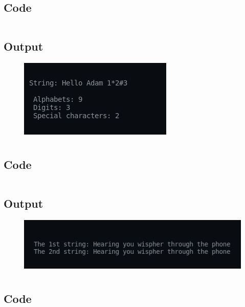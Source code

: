\documentclass[12pt]{article}
\begin{document}
\newpage
\section{}
\subsection{Code}
\inputminted{c}{q12.c}
\subsection{Output}
\begin{figure}[h]
    \centering
    \includegraphics{12.png}
\end{figure}

\newpage
\section{}
\subsection{Code}
\inputminted{c}{q13.c}
\subsection{Output}
\begin{figure}[h]
    \centering
    \includegraphics{13.png}
\end{figure}

\newpage
\section{}
\subsection{Code}
\inputminted{c}{q14.c}
\end{document}
